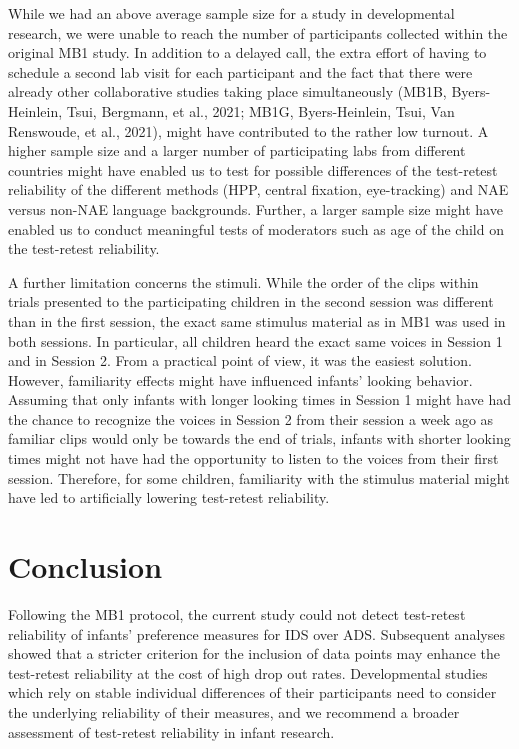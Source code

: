 \documentclass[
  man,floatsintext]{apa6}
\begin{document}
While we had an above average sample size for a study in developmental research, we were unable to reach the number of participants collected within the original MB1 study. In addition to a delayed call, the extra effort of having to schedule a second lab visit for each participant and the fact that there were already other collaborative studies taking place simultaneously (MB1B, Byers-Heinlein, Tsui, Bergmann, et al., 2021; MB1G, Byers-Heinlein, Tsui, Van Renswoude, et al., 2021), might have contributed to the rather low turnout. A higher sample size and a larger number of participating labs from different countries might have enabled us to test for possible differences of the test-retest reliability of the different methods (HPP, central fixation, eye-tracking) and NAE versus non-NAE language backgrounds. Further, a larger sample size might have enabled us to conduct meaningful tests of moderators such as age of the child on the test-retest reliability.

A further limitation concerns the stimuli. While the order of the clips within trials presented to the participating children in the second session was different than in the first session, the exact same stimulus material as in MB1 was used in both sessions. In particular, all children heard the exact same voices in Session 1 and in Session 2. From a practical point of view, it was the easiest solution. However, familiarity effects might have influenced infants' looking behavior. Assuming that only infants with longer looking times in Session 1 might have had the chance to recognize the voices in Session 2 from their session a week ago as familiar clips would only be towards the end of trials, infants with shorter looking times might not have had the opportunity to listen to the voices from their first session. Therefore, for some children, familiarity with the stimulus material might have led to artificially lowering test-retest reliability.

\hypertarget{conclusion}{%
\section{Conclusion}\label{conclusion}}

Following the MB1 protocol, the current study could not detect test-retest reliability of infants' preference measures for IDS over ADS. Subsequent analyses showed that a stricter criterion for the inclusion of data points may enhance the test-retest reliability at the cost of high drop out rates. Developmental studies which rely on stable individual differences of their participants need to consider the underlying reliability of their measures, and we recommend a broader assessment of test-retest reliability in infant research.
\end{document}
